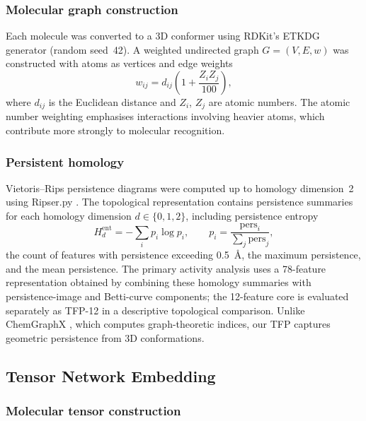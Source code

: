 \documentclass[pdflatex,sn-mathphys-num]{sn-jnl}%
\begin{document}
\subsubsection{Molecular graph construction}

Each molecule was converted to a 3D conformer using RDKit's ETKDG generator (random seed~42). A weighted undirected graph $G = (V, E, w)$ was constructed with atoms as vertices and edge weights
\begin{equation}
w_{ij} = d_{ij}\left(1 + \frac{Z_i Z_j}{100}\right),
\end{equation}
where $d_{ij}$ is the Euclidean distance and $Z_i$, $Z_j$ are atomic numbers. The atomic number weighting emphasises interactions involving heavier atoms, which contribute more strongly to molecular recognition.

\subsubsection{Persistent homology}

Vietoris--Rips persistence diagrams were computed up to homology dimension~2 using Ripser.py \cite{ripser_2019}. The topological representation contains persistence summaries for each homology dimension $d \in \{0, 1, 2\}$, including persistence entropy
\begin{equation}
H_d^{\mathrm{ent}} = -\sum_i p_i \log p_i, \qquad p_i = \frac{\mathrm{pers}_i}{\sum_j \mathrm{pers}_j},
\end{equation}
the count of features with persistence exceeding \SI{0.5}{\angstrom}, the maximum persistence, and the mean persistence. The primary activity analysis uses a 78-feature representation obtained by combining these homology summaries with persistence-image and Betti-curve components; the 12-feature core is evaluated separately as TFP-12 in a descriptive topological comparison. Unlike ChemGraphX \cite{chemgraphx_2026}, which computes graph-theoretic indices, our TFP captures geometric persistence from 3D conformations.

\subsection{Tensor Network Embedding}

\subsubsection{Molecular tensor construction}
\end{document}
